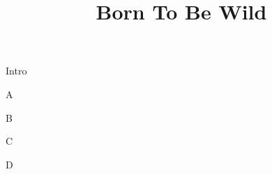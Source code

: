 \documentclass[timestamp]{jazzgrid}
\title{Born To Be Wild}
\begin{document}
\maketitle
\begin{musicsection}{Intro}
\barline
	{}
	{\barfour{}{}{}{}{}}
	{\barfour{}{}{}{}{}}
	{\barfour{}{}{}{}{}}
\barline
	{\barfour{}{}{}{}{}}
	{\barfour{}{}{}{}{}}
	{\barfour{}{}{}{}{}}
	{\barfour{}{}{}{}{}}
\end{musicsection}

\begin{musicsection}{A}
\barline
	{}
	{\barfour{}{}{}{}{}}
	{\barfour{}{}{}{}{}}
	{\barfour{}{}{}{}{}}
\barline
	{\barfour{}{}{}{}{}}
	{\barfour{}{}{}{}{}}
	{\barfour{}{}{}{}{}}
	{\barfour{}{}{}{}{}}
\end{musicsection}

\begin{musicsection}{B}
\barline
	{}
	{}
	{}
	{}
\barline
	{}
	{}
	{}
	{}
\end{musicsection}

\begin{musicsection}{C}
\barline
	{}
	{\barfour{}{}{}{}{}}
	{}
	{\barfour{}{}{}{}{}}
\barline
	{}
	{}
	{}
	{\barfour{}{}{}{}{}}
\end{musicsection}

\begin{musicsection}{D}
\barline
	{}
	{}
	{}
	{}
\barline
	{}
	{}
	{}
	{}
\end{musicsection}
\end{document}
